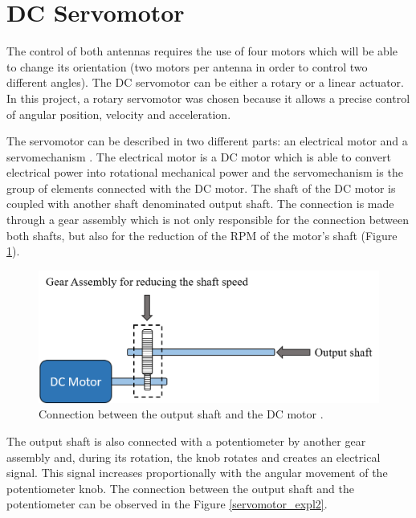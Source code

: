 \section{DC Servomotor}\label{sec:servo_motor}

The control of both antennas requires the use of four motors which will be able to change its orientation (two motors per antenna in order to control two different angles). The DC servomotor can be either a rotary or a linear actuator. In this project, a rotary servomotor was chosen because it allows a precise control of angular position, velocity and acceleration.

The servomotor can be described in two different parts: an electrical motor and a servomechanism \cite{electrical4u}. The electrical motor is a DC motor which is able to convert electrical power into rotational mechanical power and the servomechanism is the group of elements connected with the DC motor. The shaft of the DC motor is coupled with another shaft denominated output shaft. The connection is made through a gear assembly which is not only responsible for the connection between both shafts, but also for the reduction of the RPM of the motor’s shaft (Figure \ref{servomotor_expl1}).

\begin{figure}[H]
\centering
\includegraphics[scale=0.7]{figures/servomotor_expl1.png}
\caption{Connection between the output shaft and the DC motor \cite{electrical4u}.}
\label{servomotor_expl1}
\end{figure}

The output shaft is also connected with a potentiometer by another gear assembly and, during its rotation, the knob rotates and creates an electrical signal. This signal increases proportionally with the angular movement of the potentiometer knob. The connection between the output shaft and the potentiometer can be
observed in the Figure \ref{servomotor_expl2}.

